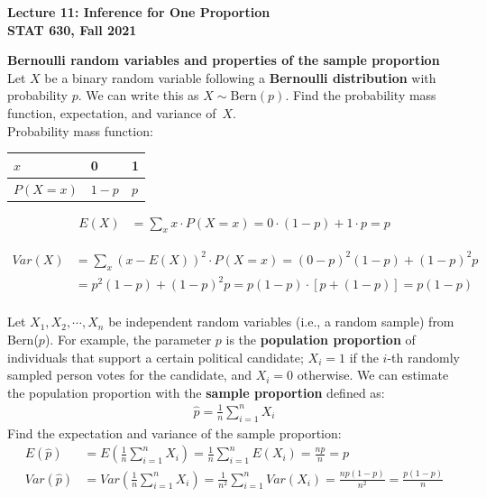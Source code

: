 \documentclass[fleqn, 11pt]{article}\usepackage[]{graphicx}\usepackage[]{color}
\begin{document}
\setlength\parindent{0pt}

\begin{center}
\textbf{Lecture 11: Inference for One Proportion}\\
\textbf{STAT 630, Fall 2021}\\
\hrulefill
\end{center}

\textbf{Bernoulli random variables and properties of the sample proportion}\\

Let $X$ be a binary random variable following a \textbf{Bernoulli distribution} with probability $p$.  We can write this as $X \sim \text{Bern}(p)$.  Find the probability mass function, expectation, and variance of~$X$.\\  

{\color{blue}Probability mass function:}
\begin{table}[ht]
{\color{blue}
\begin{tabular}{l|l|l}
$x$ & 0 & 1\\
\hline
$P(X=x)$ & $1-p$ & $p$
\end{tabular}}
\end{table}

{\color{blue}
\begin{align*}
E(X) &= \sum_{x} x \cdot P(X=x) = 0 \cdot (1-p) + 1 \cdot p = p
\end{align*}

\begin{align*}
Var(X) &= \sum_{x} (x - E(X))^2 \cdot P(X=x) = (0-p)^2 (1-p) + (1-p)^2 p\\
&= p^2 (1-p) + (1-p)^2 p = p(1-p) \cdot [p + (1-p)] = p(1-p)\\
\end{align*}
}


Let $X_1, X_2, \cdots, X_n$ be independent random variables (i.e., a random sample) from Bern($p$).  For example, the parameter $p$ is the \textbf{population proportion} of individuals that support a certain political candidate; $X_i=1$ if the $i$-th randomly sampled person votes for the candidate, and $X_i=0$ otherwise.  We can estimate the population proportion with the \textbf{sample proportion} defined as:
\begin{align*}
\hat{p} = \frac{1}{n} \sum_{i=1}^n X_i
\end{align*}
Find the expectation and variance of the sample proportion:\\
{\color{blue}
\begin{align*}
E(\hat{p}) & = E\left( \frac{1}{n} \sum_{i=1}^n X_i \right) = \frac{1}{n} \sum_{i=1}^n E(X_i) = \frac{np}{n} = p\\
Var(\hat{p}) &= Var \left( \frac{1}{n} \sum_{i=1}^n X_i \right) = \frac{1}{n^2} \sum_{i=1}^n Var(X_i) = \frac{np(1-p)}{n^2} = \frac{p(1-p)}{n}
\end{align*}}
\clearpage
\end{document}
